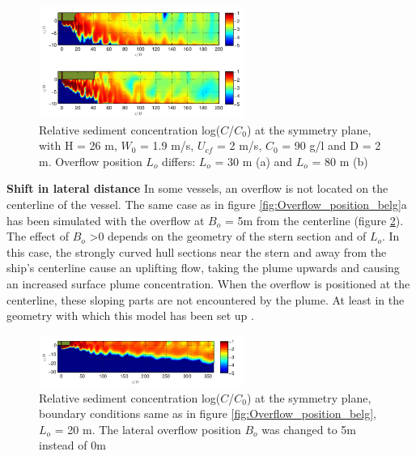 \begin{figure}[H]
    \centering
    \includegraphics[width = 0.6\textwidth]{Images/Overflow_position_belg_2.png}
    \caption{Relative sediment concentration log($C$/$C_0$) at the symmetry plane, with H = 26 m, $W_0$ = 1.9 m/s, $U_{cf}$ = 2 m/s, $C_0$ = 90 g/l and D = 2 m. Overflow position $L_o$ differs: $L_o$ = 30 m (a) and $L_o$ = 80 m (b)}
    \label{fig:Overflow_position_belg_2}
\end{figure}


\noindent \textbf{Shift in lateral distance} \newline
\noindent In some vessels, an overflow is not located on the centerline of the vessel. The same case as in figure \ref{fig:Overflow_position_belg}a has been simulated with the overflow at $B_o$ = 5m from the centerline (figure \ref{fig:Overflow_position_Bo}). The effect of $B_o$ >0 depends on the geometry of the stern section and of $L_o$. In this case, the strongly curved hull sections near the stern and away from the ship’s centerline cause an uplifting flow, taking the plume upwards and causing an increased surface plume concentration. When the overflow is positioned at the centerline, these sloping parts are not encountered by the plume. At least in the geometry with which this model has been set up \citep{Decrop}.

\begin{figure}[ht!]
    \centering
    \includegraphics[width = 0.6\textwidth]{Images/Overflow_position_Bo.png}
    \caption{Relative sediment concentration log($C$/$C_0$) at the symmetry plane, boundary conditions same as in figure \ref{fig:Overflow_position_belg}, $L_o$ = 20 m. The lateral overflow position $B_o$ was changed to 5m instead of 0m}
    \label{fig:Overflow_position_Bo}
\end{figure}


